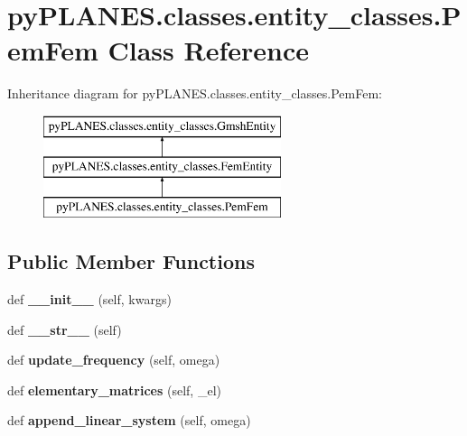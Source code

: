 \hypertarget{classpy_p_l_a_n_e_s_1_1classes_1_1entity__classes_1_1_pem_fem}{}\section{py\+P\+L\+A\+N\+E\+S.\+classes.\+entity\+\_\+classes.\+Pem\+Fem Class Reference}
\label{classpy_p_l_a_n_e_s_1_1classes_1_1entity__classes_1_1_pem_fem}
Inheritance diagram for py\+P\+L\+A\+N\+E\+S.\+classes.\+entity\+\_\+classes.\+Pem\+Fem\+:\begin{figure}[H]
\begin{center}
\leavevmode
\includegraphics[height=3.000000cm]{classpy_p_l_a_n_e_s_1_1classes_1_1entity__classes_1_1_pem_fem}
\end{center}
\end{figure}
\subsection*{Public Member Functions}
\begin{DoxyCompactItemize}
\item 
\mbox{\label{classpy_p_l_a_n_e_s_1_1classes_1_1entity__classes_1_1_pem_fem_af01b9f16713a054050250c6be7edd3cb}} 
def {\bfseries \+\_\+\+\_\+init\+\_\+\+\_\+} (self, kwargs)
\item 
\mbox{\label{classpy_p_l_a_n_e_s_1_1classes_1_1entity__classes_1_1_pem_fem_a76378d96d5a41bbedca95b8f996deb4f}} 
def {\bfseries \+\_\+\+\_\+str\+\_\+\+\_\+} (self)
\item 
\mbox{\label{classpy_p_l_a_n_e_s_1_1classes_1_1entity__classes_1_1_pem_fem_abd7d6d78db03b9ab7d76d8fb7469a649}} 
def {\bfseries update\+\_\+frequency} (self, omega)
\item 
\mbox{\label{classpy_p_l_a_n_e_s_1_1classes_1_1entity__classes_1_1_pem_fem_a716e2697308a20a478892d2abcc259da}} 
def {\bfseries elementary\+\_\+matrices} (self, \+\_\+el)
\item 
\mbox{\label{classpy_p_l_a_n_e_s_1_1classes_1_1entity__classes_1_1_pem_fem_a611e62b63ea32fc83225753d0661e66e}} 
def {\bfseries append\+\_\+linear\+\_\+system} (self, omega)
\end{DoxyCompactItemize}
